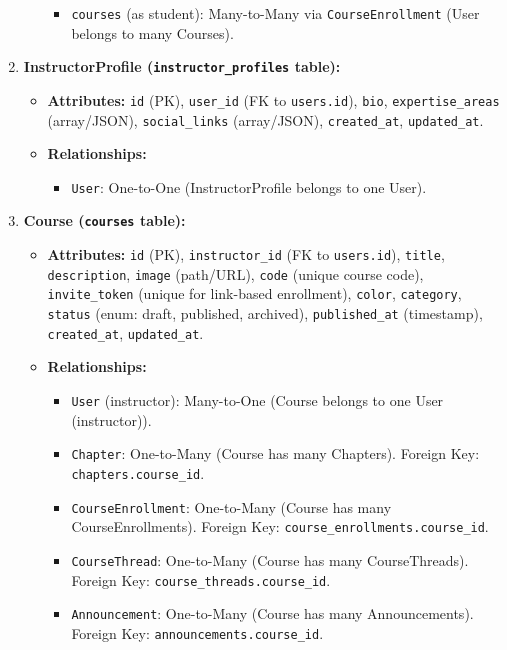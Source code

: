 \begin{enumerate}
\begin{itemize}
\begin{itemize}
            \item \texttt{courses} (as student): Many-to-Many via \texttt{CourseEnrollment} (User belongs to many Courses).
        \end{itemize}
    \end{itemize}
    \item \textbf{InstructorProfile (\texttt{instructor\_profiles} table):}
    \begin{itemize}
        \item \textbf{Attributes:} \texttt{id} (PK), \texttt{user\_id} (FK to \texttt{users.id}), \texttt{bio}, \texttt{expertise\_areas} (array/JSON), \texttt{social\_links} (array/JSON), \texttt{created\_at}, \texttt{updated\_at}.
        \item \textbf{Relationships:}
        \begin{itemize}
            \item \texttt{User}: One-to-One (InstructorProfile belongs to one User).
        \end{itemize}
    \end{itemize}
    \item \textbf{Course (\texttt{courses} table):}
    \begin{itemize}
        \item \textbf{Attributes:} \texttt{id} (PK), \texttt{instructor\_id} (FK to \texttt{users.id}), \texttt{title}, \texttt{description}, \texttt{image} (path/URL), \texttt{code} (unique course code), \texttt{invite\_token} (unique for link-based enrollment), \texttt{color}, \texttt{category}, \texttt{status} (enum: draft, published, archived), \texttt{published\_at} (timestamp), \texttt{created\_at}, \texttt{updated\_at}.
        \item \textbf{Relationships:}
        \begin{itemize}
            \item \texttt{User} (instructor): Many-to-One (Course belongs to one User (instructor)).
            \item \texttt{Chapter}: One-to-Many (Course has many Chapters). Foreign Key: \texttt{chapters.course\_id}.
            \item \texttt{CourseEnrollment}: One-to-Many (Course has many CourseEnrollments). Foreign Key: \texttt{course\_enrollments.course\_id}.
            \item \texttt{CourseThread}: One-to-Many (Course has many CourseThreads). Foreign Key: \texttt{course\_threads.course\_id}.
            \item \texttt{Announcement}: One-to-Many (Course has many Announcements). Foreign Key: \texttt{announcements.course\_id}.

\end{itemize}
\end{itemize}
\end{enumerate}
